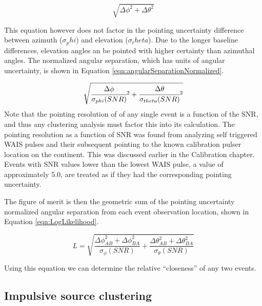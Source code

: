 	\begin{equation}
		\sqrt{\Delta\phi^2 + \Delta\theta^2}
		\label{eqn:angularSeparation}
	\end{equation}
	
	This equation however does not factor in the pointing uncertainty difference between azimuth ($\sigma_phi$) and elevation ($\sigma_theta$). Due to the longer baseline differences, elevation angles an be pointed with higher certainty than azimuthal angles.  The normalized angular separation, which has units of angular uncertainty, is shown in Equation \ref{eqn:angularSeparationNormalized}.
	
	\begin{equation}
		\sqrt{\cfrac{\Delta\phi}{\sigma_{phi}(SNR)}^2 + \cfrac{\Delta\theta}{\sigma_{theta}(SNR)}^2}
		\label{eqn:angularSeparationNormalized}
	\end{equation}
		Note that the pointing resolution  of of any single event is a function of the SNR, and thus any clustering analysis must factor this into its calculation.  The pointing resolution as a function of SNR was found from analyzing self triggered WAIS pulses and their subsequent pointing to the known calibration pulser location on the continent.  This was discussed earlier in the Calibration chapter.  Events with SNR values lower than the lowest WAIS pulse, a value of approximately 5.0, are treated as if they had the corresponding pointing uncertainty.
		
		The figure of merit is then the geometric sum of the pointing uncertainty normalized angular separation from each event observation location, shown in Equation \ref{eqn:LogLikelihood}.
		
	\begin{equation}
		L = \sqrt{\frac{\Delta\phi_{AB}^2   + \Delta\phi_{BA}^2}{\sigma_{\phi}(SNR)} + \frac{\Delta\theta_{AB}^2 + \Delta\theta_{BA}^2}{\sigma_{\theta}(SNR)}}
		\label{eqn:LogLikelihood}
	\end{equation}


		Using this equation we can determine the relative ``closeness'' of any two events.  
		
	
	\subsection{Impulsive source clustering}
	



